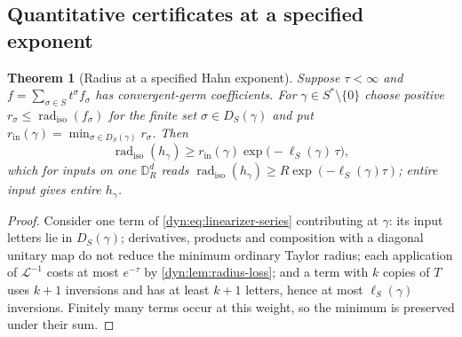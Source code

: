 \documentclass[11pt,letterpaper]{article}
\newtheorem{theorem}{Theorem}[section]
\theoremstyle{definition}
\theoremstyle{remark}
\newcommand{\radiso}{\operatorname{rad}_{\mathrm{iso}}}
\newcommand{\Li}{\mathcal L}
\numberwithin{equation}{section}
\begin{document}
\subsection{Quantitative certificates at a specified exponent}

\begin{theorem}[Radius at a specified Hahn exponent]\label{dyn:thm:radius-depth}
Suppose $\tau<\infty$ and $f=\sum_{\sigma\in S}t^{\sigma}f_\sigma$ has
convergent-germ coefficients. For $\gamma\in S^{*}\setminus\{0\}$ choose
positive $r_\sigma\le\radiso(f_\sigma)$ for the finite set
$\sigma\in D_S(\gamma)$ and put
$r_{\mathrm{in}}(\gamma)=\min_{\sigma\in D_S(\gamma)}r_\sigma$. Then
\begin{equation}\label{dyn:eq:radius-depth}
 \radiso(h_\gamma)\ge r_{\mathrm{in}}(\gamma)
 \exp\bigl(-\ell_S(\gamma)\,\tau\bigr),
\end{equation}
which for inputs on one $\mathbb D_R^{d}$ reads
$\radiso(h_\gamma)\ge R\exp(-\ell_S(\gamma)\tau)$; entire input gives
entire $h_\gamma$.
\end{theorem}
\begin{proof}
Consider one term of \eqref{dyn:eq:linearizer-series} contributing at
$\gamma$: its input letters lie in $D_S(\gamma)$; derivatives, products and
composition with a diagonal unitary map do not reduce the minimum ordinary
Taylor radius; each application of $\Li^{-1}$ costs at most $e^{-\tau}$ by
\cref{dyn:lem:radius-loss}; and a term with $k$ copies of $T$ uses $k+1$
inversions and has at least $k+1$ letters, hence at most $\ell_S(\gamma)$
inversions. Finitely many terms occur at this weight, so the minimum is
preserved under their sum.
\end{proof}
\end{document}
